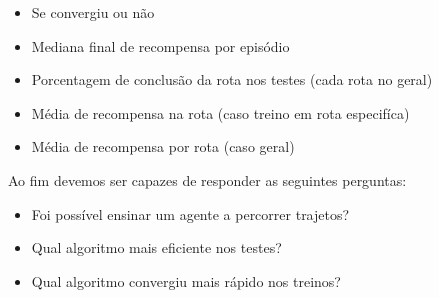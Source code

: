 \begin{itemize}
   \item Se convergiu ou não
   \item Mediana final de recompensa por episódio
   \item Porcentagem de conclusão da rota nos testes (cada rota no geral)
   \item Média de recompensa na rota (caso treino em rota especifíca)
   \item Média de recompensa por rota (caso geral)
\end{itemize}


Ao fim devemos ser capazes de responder as seguintes perguntas:
\begin{itemize}
   \item Foi possível ensinar um agente a percorrer trajetos?
   \item Qual algoritmo mais eficiente nos testes? 
   \item Qual algoritmo convergiu mais rápido nos treinos?
\end{itemize}